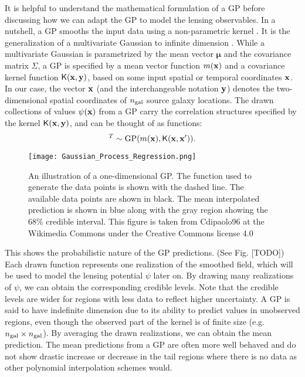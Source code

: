 It is helpful to understand the mathematical formulation of a GP 
before discussing how we can adapt the GP to model the lensing observables. 
In a nutshell, a GP smooths the input data using a non-parametric kernel
\citep{Hastie1990}. 
It is the generalization of a multivariate Gaussian 
to infinite dimension \citep{Rasmussen2006}. 
While a multivariate Gaussian is parametrized by  
the mean vector $\mathbf{\mu}$ and the covariance matrix $\Sigma$, 
a GP is specified by a mean vector function $m(\mathbf{x})$ and a
covariance kernel function $\mathsf{K}(\mathbf{x}, \mathbf{y})$, based on some input spatial or
temporal coordinates $\mathbf{x}$. In our case, the vector $\mathbf{x}$ (and the
interchangeable notation $\mathbf{y}$) denotes the
two-dimensional spatial coordinates of $n_{\rm gal}$ source galaxy locations. 
The drawn collections of values $\psi(\mathbf{x})$ from a GP carry the correlation structures
specified by the kernel $\mathsf{K}(\mathbf{x}, \mathbf{y})$, and can be thought of as
functions: 
\begin{equation}
		[\psi_1(\xv), \psi_2(\xv) \ldots, \psi_m(\xv) ]^T \sim \gp(m(\xv), \kerngp(\xv, \xv')).
		\label{eq:GP}
\end{equation}
\begin{figure}
	\centering
	\texttt{[image: Gaussian\_Process\_Regression.png]}
	\caption{An illustration of a one-dimensional GP. The
		function used to generate the data points 
		is shown with the dashed line. The available data points are shown in
		black. The mean interpolated prediction is shown in blue
		along with the gray region showing the 68\% 
		credible interval. This figure is taken from Cdipaolo96 at 
		the Wikimedia Commons under the Creative Commons license 4.0
\label{fig:one_d_gaussian_process}}
\end{figure}


This shows the probabilistic nature of the GP predictions.
(See Fig. [TODO])
Each drawn function represents one realization of the smoothed
field, which will be used to model the lensing potential $\psi$ later on. 
By drawing many realizations of $\psi$, we can obtain the
corresponding credible levels.
Note that the credible levels are wider for regions with less data to reflect
higher uncertainty. A GP is said to have indefinite dimension due to its ability to
predict values in unobserved regions, even though the 
observed part of the kernel is of finite size (e.g. $n_{\rm gal} \times n_{\rm gal}$). 
By averaging the drawn realizations, we can
obtain the mean prediction. The mean predictions from a GP are
often more well behaved and do not show drastic increase or decrease 
in the tail regions where there is no data as other polynomial interpolation schemes 
would.  

